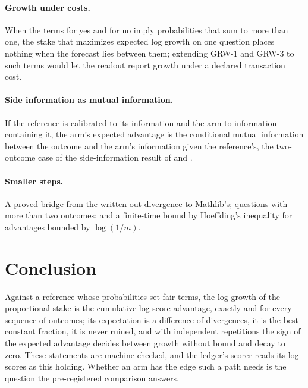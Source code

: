 \documentclass[11pt]{article}
\theoremstyle{plain}
\theoremstyle{definition}
\theoremstyle{remark}
\begin{document}
\paragraph{Growth under costs.} When the terms for yes and for no imply probabilities that sum to
more than one, the stake that maximizes expected log growth on one question places nothing when the
forecast lies between them; extending GRW-1 and GRW-3 to such terms would let the readout report
growth under a declared transaction cost.

\paragraph{Side information as mutual information.} If the reference is calibrated to its
information and the arm to information containing it, the arm's expected advantage is the
conditional mutual information between the outcome and the arm's information given the
reference's, the two-outcome case of the side-information result of \citet{kelly1956} and
\citet[chap.~6]{cover2006}.

\paragraph{Smaller steps.} A proved bridge from the written-out divergence to Mathlib's; questions
with more than two outcomes; and a finite-time bound by Hoeffding's inequality for advantages
bounded by $\log(1/m)$.

\section{Conclusion}

Against a reference whose probabilities set fair terms, the log growth of the proportional stake is
the cumulative log-score advantage, exactly and for every sequence of outcomes; its expectation is a
difference of divergences, it is the best constant fraction, it is never ruined, and with
independent repetitions the sign of the expected advantage decides between growth without bound and
decay to zero. These statements are machine-checked, and the ledger's scorer reads its log scores
as this holding. Whether an arm has the edge such a path needs is the question the pre-registered
comparison answers.



\end{document}
